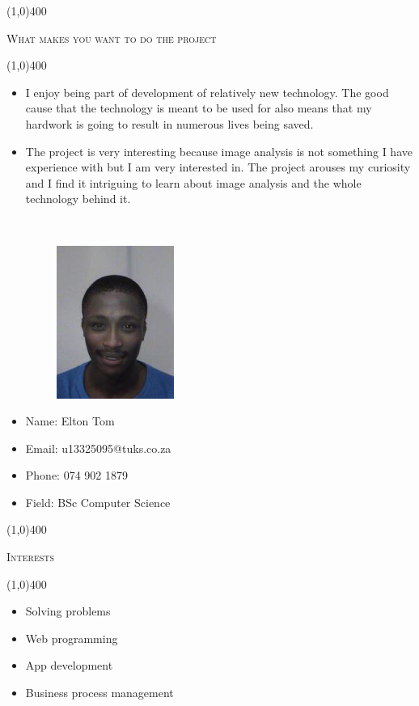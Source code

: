 \documentclass[12pt,a4paper]{report}
\begin{document}
\begin{center}
	
	\line(1,0){400}\\
	{\scshape\large What makes you want to do the project\par}
	\line(1,0){400}\\
	\end{center}
		\begin{itemize}
\item I enjoy being part of development of relatively new technology. The good cause that the technology is meant to be used for also means that my hardwork is going to result in numerous lives being saved.
\item The project is very interesting because image analysis is not something I have experience with but I am very interested in. The project arouses my curiosity and I find it intriguing to learn about image analysis and the whole technology behind it.
\end{itemize}

\newpage
\vspace*{-3cm}\
\begin{minipage}{0.5\textwidth}
\begin{figure}[H]
\includegraphics[width=5cm,height=5cm,keepaspectratio]{u13325095.jpeg}
\end{figure}
\end{minipage} \hfill
\begin{minipage}{0.6\textwidth}
\begin{itemize}
\item[] Name: Elton Tom
\item[] Email: u13325095@tuks.co.za
\item[] Phone: 074 902 1879
\item[] Field: BSc Computer Science
\end{itemize}
\end{minipage}

\begin{center}
	
	\line(1,0){400}\\
	{\scshape\large Interests\par}
	\line(1,0){400}\\
	\end{center}
	\begin{itemize}
	\item 
		Solving problems
	\item 
		Web programming
	\item 
		App development
	\item 
		Business process management
	\end{itemize}
	
\end{document}
